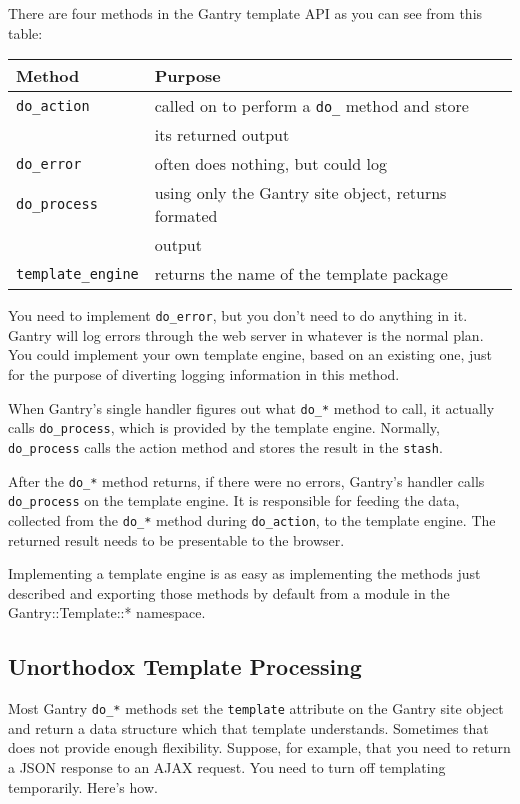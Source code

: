 There are four methods in the Gantry template API as you can see from this
table:

\begin{tabular}{l|l}
Method & Purpose \\
\hline
\verb+do_action+       & called on to perform a \verb+do_+ method and store  \\
                       & its returned output                                 \\
\verb+do_error+        & often does nothing, but could log                   \\
\verb+do_process+      & using only the Gantry site object, returns formated \\
                       & output                                              \\
\verb+template_engine+ & returns the name of the template package            \\
\end{tabular}

You need to implement \verb+do_error+, but you don't need to do anything in
it.  Gantry will log errors through the web server in whatever is the
normal plan.  You could implement your own template engine, based on an
existing one, just for the purpose of diverting logging information in
this method.

When Gantry's single handler figures out what \verb+do_*+ method to call, 
it actually calls \verb+do_process+, which is provided by the template
engine.  Normally, \verb+do_process+ calls the action method and stores
the result in the \verb+stash+.

After the \verb+do_*+ method returns, if there were no errors, Gantry's
handler calls \verb+do_process+ on the template engine.  It is responsible
for feeding the data, collected from the \verb+do_*+ method during
\verb+do_action+, to the template engine.  The returned result needs to
be presentable to the browser.

Implementing a template engine is as easy as implementing the methods just
described and exporting those methods by default from a module in the
Gantry::Template::* namespace.

\subsection*{Unorthodox Template Processing}

Most Gantry \verb+do_*+ methods set the \verb+template+ attribute
on the Gantry site object and return a data structure which that
template understands.  Sometimes that does not provide enough flexibility.
Suppose, for example, that you need to return a JSON response to an
AJAX request.  You need to turn off templating temporarily.  Here's how.

